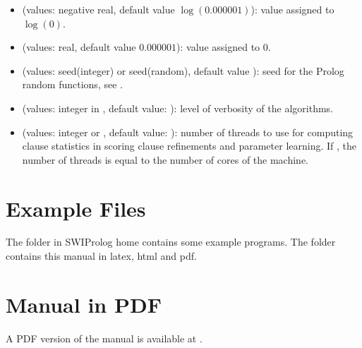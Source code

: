 \documentclass[letterpaper,10pt,english]{sphinxmanual}
\begin{document}
\begin{itemize}
\item {} 
\sphinxAtStartPar
{} (values: negative real, default value \(\log(0.000001)\)): value assigned to \(\log(0)\).

\item {} 
\sphinxAtStartPar
{} (values: real, default value \(0.000001\)): value assigned to \(0\).

\item {} 
\sphinxAtStartPar
{} (values: seed(integer) or seed(random), default value ): seed for the Prolog random functions, see  .

\item {} 
\sphinxAtStartPar
{} (values: integer in \sphinxcode{\sphinxupquote{{[}1,4{]}}}, default value: ): level of verbosity of the algorithms.

\item {} 
\sphinxAtStartPar
{} (values: integer or , default value: ): number of threads to use for computing clause statistics in scoring clause refinements and parameter learning. If , the number of threads is equal to the number of cores of the machine.

\end{itemize}


\chapter{Example Files}
\label{\detokenize{index:example-files}}
\sphinxAtStartPar
The  folder in SWI\sphinxhyphen{}Prolog home contains some example programs.
The  folder contains this manual in latex, html and pdf.


\chapter{Manual in PDF}
\label{\detokenize{index:manual-in-pdf}}
\sphinxAtStartPar
A PDF version of the manual is available at .
\end{document}
